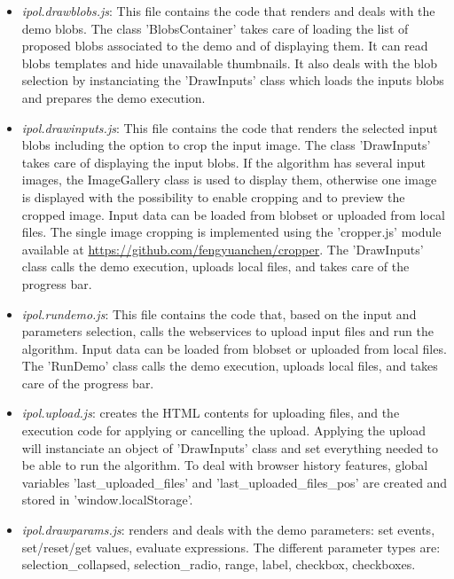 \begin{itemize}
 \item \emph{ipol.drawblobs.js}: This file contains the code that renders and 
  deals with the demo blobs. The class 'BlobsContainer' takes care of loading
  the list of proposed blobs associated to the demo and of displaying them.
  It can read blobs templates and hide unavailable thumbnails. It also
  deals with the blob selection by instanciating the 'DrawInputs' class which loads
  the inputs blobs and prepares the demo execution.

 \item \emph{ipol.drawinputs.js}: This file contains the code that renders 
  the selected input blobs including the option to crop the input image. The class
  'DrawInputs' takes care of displaying the input blobs.
  If the algorithm has several input images, the ImageGallery class is used
  to display them, otherwise one image is displayed with the possibility to 
  enable cropping and to preview the cropped image. Input data can be loaded
  from blobset or uploaded from local files. The single image cropping is
  implemented using the 'cropper.js' module available at 
  \url{https://github.com/fengyuanchen/cropper}. The 'DrawInputs' class
  calls the demo execution, uploads local files, and takes care of the progress bar.

 \item \emph{ipol.rundemo.js}: This file contains the code that, based on the 
  input and parameters selection, calls the webservices to upload input files
  and run the algorithm. Input data can be loaded
  from blobset or uploaded from local files. The 'RunDemo' class
  calls the demo execution, uploads local files, and takes care of the progress bar.

 \item \emph{ipol.upload.js}: creates the HTML contents for uploading
  files, and the execution code for applying or cancelling the upload. Applying 
  the upload will instanciate an object of 'DrawInputs' class and set everything
  needed to be able to run the algorithm. To deal with browser history features,
  global variables 'last\_uploaded\_files' and 'last\-\_up\-loaded\-\_files\-\_pos' are created
  and stored in 'window.localStorage'.

 \item \emph{ipol.drawparams.js}: renders and deals with the demo parameters:
  set events, set/reset/get values, evaluate expressions. The different parameter
  types are: selection\_collapsed,  selection\_radio,  range,  label,  checkbox,  
  checkboxes.



\end{itemize}
